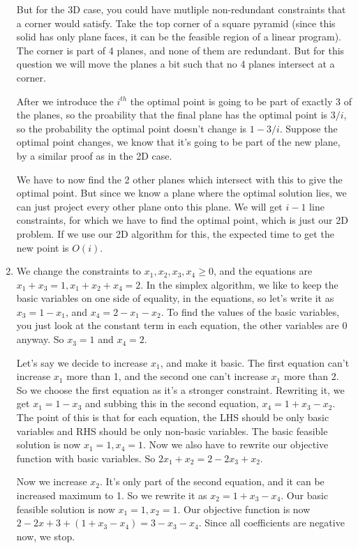 \documentclass[12pt]{report}
\begin{document}
\begin{enumerate}[label=\textbf{\arabic*.}]
    But for the 3D case, you could have mutliple non-redundant constraints that a corner would satisfy. Take the top corner of a square 
    pyramid (since this solid has only plane faces, it can be the feasible region of a linear program). The corner is part of 4 planes, 
    and none of them are redundant. But for this question we will move the planes a bit such that no 4 planes intersect at a corner.

    After we introduce the $i^{th}$ the optimal point is going to be part of exactly 3 of the planes, so the proability that the final
    plane has the optimal point is $3/i$, so the probability the optimal point doesn't change is $1 - 3/i$. Suppose the optimal point 
    changes, we know that it's going to be part of the new plane, by a similar proof as in the 2D case.

    We have to now find the 2 other planes which intersect with this to give the optimal point. But since we know a plane where the
    optimal solution lies, we can just project every other plane onto this plane. We will get $i-1$ line constraints, for which we 
    have to find the optimal point, which is just our 2D problem. If we use our 2D algorithm for this, the expected time to get the 
    new point is $O(i)$.

    \item We change the constraints to $x_1, x_2, x_3, x_4 \geq 0$, and the equations are $x_1 + x_3 = 1, x_1 + x_2 + x_4 = 2$.
    In the simplex algorithm, we like to keep the basic variables on one side of equality, in the equations, so let's write it 
    as $x_3 = 1 - x_1$, and $x_4 = 2 - x_1 - x_2$. To find the values of the basic variables, you just look at the constant 
    term in each equation, the other variables are 0 anyway. So $x_3 = 1$ and $x_4 = 2$.

    Let's say we decide to increase $x_1$, and make it basic. The first equation can't increase $x_1$ more than 1, and the 
    second one can't increase $x_1$ more than 2. So we choose the first equation as it's a stronger constraint. Rewriting it,
    we get $x_1 = 1 - x_3$ and subbing this in the second equation, $x_4 = 1 + x_3 - x_2$. The point of this is that for each 
    equation, the LHS should be only basic variables and RHS should be only non-basic variables.
    The basic feasible solution is now $x_1 = 1, x_4 = 1$.
    Now we also have to rewrite our objective function with basic variables. So $2x_1 + x_2 = 2 - 2x_3 + x_2$. 

    Now we increase $x_2$. It's only part of the second equation, and it can be increased maximum to 1. So we rewrite it as 
    $x_2 = 1 + x_3 - x_4$. Our basic feasible solution is now $x_1 = 1, x_2 = 1$.
    Our objective function is now $2 - 2x+3 + (1 + x_3 - x_4) = 3 - x_3 - x_4$. Since all coefficients are negative now, we 
    stop.


\end{enumerate}
\end{document}
